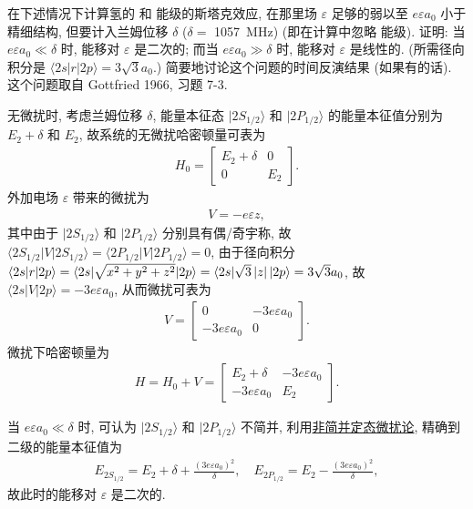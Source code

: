 \documentclass{assignment}
\begin{document}
\begin{prob}[课本习题 5.13]
    在下述情况下计算氢的  和  能级的斯塔克效应, 在那里场 $\varepsilon$ 足够的弱以至 $e\varepsilon a_0$ 小于精细结构, 但要计入兰姆位移 $\delta$ ($\delta=$ \SI{1057}{MHz}) (即在计算中忽略  能级). 证明: 当 $e\varepsilon a_0\ll\delta$ 时, 能移对 $\varepsilon$ 是二次的; 而当 $e\varepsilon a_0\gg\delta$ 时, 能移对 $\varepsilon$ 是线性的. (所需径向积分是 $\langle 2s\rvert r\lvert 2p\rangle=3\sqrt{3}a_0$.) 简要地讨论这个问题的时间反演结果 (如果有的话). 这个问题取自 Gottfried 1966, 习题 7-3.
\end{prob}
\begin{sol}
    无微扰时, 考虑兰姆位移 $\delta$, 能量本征态 $\lvert 2S_{1/2}\rangle$ 和 $\lvert 2P_{1/2}\rangle$ 的能量本征值分别为 $E_2+\delta$ 和 $E_2$, 故系统的无微扰哈密顿量可表为
    \begin{align}
        H_0=\begin{bmatrix}
            E_2+\delta&0\\
            0&E_2
        \end{bmatrix}.
    \end{align}
    外加电场 $\varepsilon$ 带来的微扰为
    \begin{align}
        V=-e\varepsilon z,
    \end{align}
    其中由于 $\lvert 2S_{1/2}\rangle$ 和 $\lvert 2P_{1/2}\rangle$ 分别具有偶/奇宇称, 故 $\langle 2S_{1/2}\rvert V\lvert 2S_{1/2}\rangle=\langle 2P_{1/2}\rvert V\lvert 2P_{1/2}\rangle=0$, 由于径向积分 $\langle 2s\rvert r\lvert 2p\rangle=\langle 2s\rvert\sqrt{x^2+y^2+z^2}\lvert 2p\rangle=\langle 2s\rvert\sqrt{3}\left\lvert z\right\rvert\lvert 2p\rangle=3\sqrt{3}a_0$, 故 $\langle 2s\rvert V\lvert 2p\rangle=-3e\varepsilon a_0$, 从而微扰可表为
    \begin{align}
        V=\begin{bmatrix}
            0&-3e\varepsilon a_0\\
            -3e\varepsilon a_0&0
        \end{bmatrix}.
    \end{align}
    微扰下哈密顿量为
    \begin{align}
        H=H_0+V=\begin{bmatrix}
            E_2+\delta&-3e\varepsilon a_0\\
            -3e\varepsilon a_0&E_2
        \end{bmatrix}.
    \end{align}

    当 $e\varepsilon a_0\ll\delta$ 时, 可认为 $\lvert 2S_{1/2}\rangle$ 和 $\lvert 2P_{1/2}\rangle$ 不简并, 利用\uline{非简并定态微扰论}, 精确到二级的能量本征值为
    \begin{align}
        E_{2S_{1/2}}=E_2+\delta+\frac{(3e\varepsilon a_0)^2}{\delta},\quad E_{2P_{1/2}}=E_2-\frac{(3e\varepsilon a_0)^2}{\delta},
    \end{align}
    故此时的能移对 $\varepsilon$ 是二次的.


\end{sol}
\end{document}
